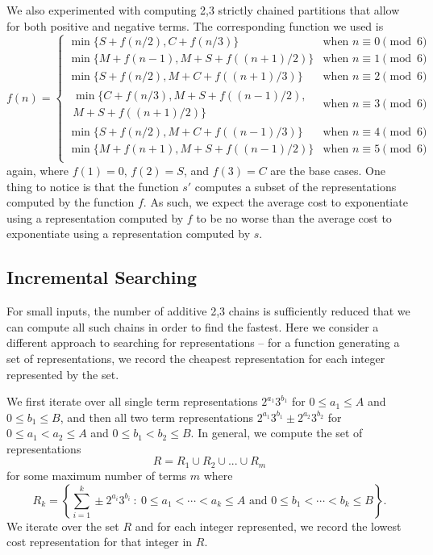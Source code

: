 \documentclass{ucalgthes1}
\theoremstyle{definition}
\begin{document}
We also experimented with computing 2,3 strictly chained partitions that allow for both positive and negative terms.  The corresponding function we used is
\begin{equation*}
f(n) = \begin{cases}
	\min\{S + f(n/2), C + f(n/3)\} & \textrm{when } n \equiv 0 \pmod 6 \\
	\min\{M + f(n-1), M + S + f((n+1)/2)\} & \textrm{when } n \equiv 1 \pmod 6 \\
	\min\{S + f(n/2), M + C + f((n+1)/3)\} & \textrm{when } n \equiv 2 \pmod 6 \\
	\begin{split}\min\{C + f(n/3), M + S + f((n-1)/2),\\M + S + f((n+1)/2)\}\end{split} & \textrm{when } n \equiv 3 \pmod 6 \\
	\min\{S + f(n/2), M + C + f((n-1)/3)\} & \textrm{when } n \equiv 4 \pmod 6 \\
	\min\{M + f(n+1), M + S + f((n-1)/2)\} & \textrm{when } n \equiv 5 \pmod 6 \\
\end{cases}
\end{equation*}
again, where $f(1) = 0$, $f(2) = S$, and $f(3) = C$ are the base cases.  One thing to notice is that the function $s'$ computes a subset of the representations computed by the function $f$.  As such, we expect the average cost to exponentiate using a representation computed by $f$ to be no worse than the average cost to exponentiate using a representation computed by $s$.

\subsection{Incremental Searching}
\label{subsec:incrementalSearching}

For small inputs, the number of additive 2,3 chains is sufficiently reduced that we can compute all such chains in order to find the fastest.  Here we consider a different approach to searching for representations -- for a function generating a set of representations, we record the cheapest representation for each integer represented by the set.

We first iterate over all single term representations $2^{a_1}3^{b_1}$ for $0 \le a_1 \le A$ and $0 \le b_1 \le B$, and then all two term representations $2^{a_1}3^{b_1} \pm 2^{a_2}3^{b_2}$ for $0 \le a_1 < a_2 \le A$ and $0 \le b_1 < b_2 \le B$.  In general, we compute the set of representations
\[
R = R_1 \cup R_2 \cup ... \cup R_m
\]
for some maximum number of terms $m$ where
\[
R_k = \left\{\sum_{i=1}^k\pm 2^{a_i}3^{b_i} ~:~ 0 \le a_1 < \cdots < a_k \le A \textrm{ and } 0 \le b_1 < \cdots < b_k \le B \right\}.
\]
We iterate over the set $R$ and for each integer represented, we record the lowest cost representation for that integer in $R$.
\end{document}
